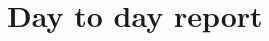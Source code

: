 \documentclass{report}
\begin{document}
	\section{Day to day report}
	
	
	
	
	
	
	
	
\end{document}
